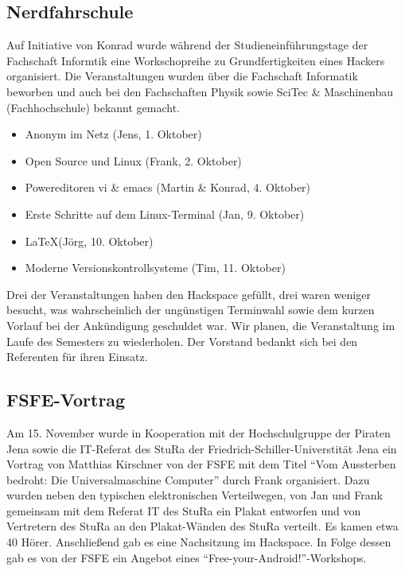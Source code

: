 \documentclass[10pt,DIV16]{scrartcl}
\begin{document}
\subsection{Nerdfahrschule}

Auf Initiative von Konrad wurde während der Studieneinführungstage der
Fachschaft Informtik eine Workschopreihe zu Grundfertigkeiten eines Hackers
organisiert.  Die Veranstaltungen wurden über die Fachschaft Informatik
beworben und auch bei den Fachschaften Physik sowie SciTec \& Maschinenbau
(Fachhochschule) bekannt gemacht.

\begin{itemize}
	\item Anonym im Netz (Jens, 1. Oktober)
	\item Open Source und Linux (Frank, 2. Oktober)
	\item Powereditoren vi \& emacs (Martin \& Konrad, 4. Oktober)
	\item Erste Schritte auf dem Linux-Terminal (Jan, 9. Oktober)
	\item \LaTeX (Jörg, 10. Oktober)
	\item Moderne Versionskontrollsysteme (Tim, 11. Oktober)
\end{itemize}

Drei der Veranstaltungen haben den Hackspace gefüllt, drei waren weniger
besucht, was wahrscheinlich der ungünstigen Terminwahl sowie dem kurzen
Vorlauf bei der Ankündigung geschuldet war.  Wir planen, die Veranstaltung im
Laufe des Semesters zu wiederholen.  Der Vorstand bedankt sich bei den
Referenten für ihren Einsatz.

\subsection{FSFE-Vortrag}

Am 15. November wurde in Kooperation mit der Hochschulgruppe der
Piraten Jena sowie die IT-Referat des StuRa der
Friedrich-Schiller-Universtität Jena ein Vortrag von Matthias
Kirschner von der FSFE mit dem Titel "`Vom Aussterben bedroht: Die
Universalmaschine Computer"' durch Frank organisiert.  Dazu wurden
neben den typischen elektronischen Verteilwegen, von Jan und Frank
gemeinsam mit dem Referat IT des StuRa ein Plakat entworfen und von
Vertretern des StuRa an den Plakat-Wänden des StuRa verteilt. Es
kamen etwa 40 Hörer. Anschließend gab es eine Nachsitzung im
Hackspace. In Folge dessen gab es von der FSFE ein Angebot eines
"`Free-your-Android!"'-Workshops.
\end{document}
